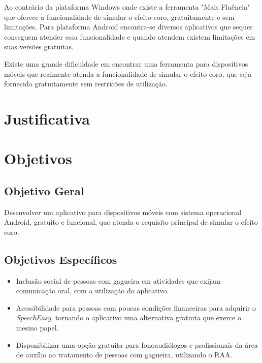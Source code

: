 Ao contr\'ario da plataforma Windows onde existe a ferramenta "Mais Flu\^encia" que oferece a funcionalidade de simular o efeito coro, gratuitamente e sem limita\c{c}\~oes. Para plataforma Android encontra-se diversos aplicativos que sequer conseguem atender essa funcionalidade e quando atendem existem limita\c{c}\~oes em suas vers\~oes gratuitas.

Existe uma grande dificuldade em encontrar uma ferramenta para dispositivos m\'oveis que realmente atenda a funcionalidade de simular o efeito coro, que seja fornecida gratuitamente sem restric\~oes de utiliza\c{c}\~ao. 

\section{Justificativa}

\section{Objetivos}

\subsection{Objetivo Geral}

Desenvolver um aplicativo para dispositivos m\'oveis com sistema operacional Android, gratuito e funcional, que atenda o requisito principal de simular o efeito coro. 

\subsection{Objetivos Espec\'ificos}

\begin{itemize}
	\item Inclus\~ao social de pessoas com gagueira em atividades que exijam comunica\c{c}\~ao oral, com a utiliza\c{c}\~ao do aplicativo.
	\item Acessibilidade para pessoas com poucas condi\c{c}\~oes financeiras para adquirir o \textit{SpeechEasy}, tornando o aplicativo uma alternativa gratuita que exerce o mesmo papel.
	\item Disponibilizar uma op\c{c}\~ao gratuita para fonoaudi\'ologos e profissionais da \'area de aux\'ilio ao tratamento de pessoas com gagueira, utilizando o RAA.
\end{itemize} 